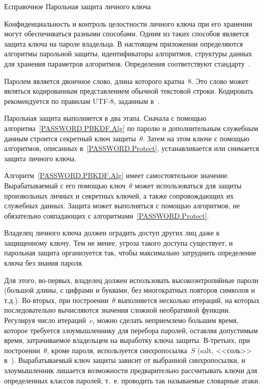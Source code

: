 \begin{appendix}{Е}{справочное}
{Парольная защита личного ключа}
\label{PASSWORD}

\label{PASSWORD.Common}

Конфиденциальность и контроль целостности личного ключа при его хранении могут
обеспечиваться разными способами. Одним из таких способов является защита ключа
на пароле владельца.
%
В настоящем приложении определяются алгоритмы парольной защиты, идентификаторы
алгоритмов, структуры данных для хранения параметров алгоритмов. Определения
соответствуют стандарту~\cite{PKCS5}.

Паролем является двоичное слово, длина которого кратна~$8$. Это слово может
являться кодированным представлением обычной текстовой строки. Кодировать
рекомендуется по правилам UTF-8, заданным в~\cite{UTF8}.

Парольная защита выполняется в два этапа. Сначала с помощью
алгоритма~\ref{PASSWORD.PBKDF.Alg} по паролю и дополнительным служебным данным
строится секретный ключ защиты~$\theta$. Затем на этом ключе с помощью
алгоритмов, описанных в~\ref{PASSWORD.Protect}, устанавливается или снимается
защита личного ключа.

Алгоритм~\ref{PASSWORD.PBKDF.Alg} имеет самостоятельное значение. Вырабатываемый
с его помощью ключ~$\theta$ может использоваться для защиты произвольных личных
и секретных ключей, а также сопровождающих их служебных данных. Защита может
выполняться с помощью алгоритмов, не обязательно совпадающих с
алгоритмами~\ref{PASSWORD.Protect}.

Владелец личного ключа должен оградить доступ других лиц даже к защищенному
ключу.
%
Тем не менее, угроза такого доступа существует, и парольная защита организуется
так, чтобы максимально затруднить определение ключа без знания пароля.

Для этого, во-первых, владелец должен использовать высокоэнтропийные пароли
(большой длины, с цифрами и буквами, без многократных повторов символов и т.д.).
%
Во-вторых, при построении~$\theta$ выполняется несколько итераций, на которых
последовательно вычисляются значения сложной необратимой функции.
%
Регулируя число итераций~$c$, можно сделать неприемлемо большим время, которое
требуется злоумышленнику для перебора паролей, оставляя допустимым время,
затрачиваемое владельцем на выработку ключа защиты.
%
В-третьих, при построении~$\theta$, кроме пароля, используется синхропосылка~$S$
(salt, <<соль>> в~\cite{PKCS5}). Вырабатываемый ключ защиты зависит от выбранной
синхропосылки, и злоумышленник лишается возможности предварительно рассчитывать
ключи для определенных классов паролей, т.~е. проводить так называемые словарные
атаки.


\end{appendix}
